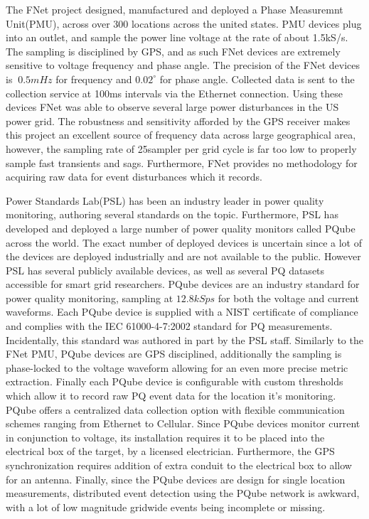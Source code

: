 The FNet project designed, manufactured and deployed a Phase Measuremnt Unit(PMU), across over 300 locations across the united states.\cite{zhang2010wide} PMU devices plug into an outlet, and sample the power line voltage at the rate of about 1.5kS/s. The sampling is disciplined by GPS, and as such FNet devices are extremely sensitive to voltage frequency and phase angle. The precision of the FNet devices is $~0.5mHz$ for frequency and $0.02^{\circ}$ for phase angle. Collected data is sent to the collection service at 100ms intervals via the Ethernet connection. Using these devices FNet was able to observe several large power disturbances in the US power grid. The robustness and sensitivity afforded by the GPS receiver makes this project an excellent source of frequency data across large geographical area, however,  the sampling rate of 25sampler per grid cycle is far too low to properly sample fast transients and sags. Furthermore, FNet provides no methodology for acquiring raw data for event disturbances which it records.

Power Standards Lab(PSL) has been an industry leader in power quality monitoring, authoring several standards on the topic. Furthermore, PSL has developed and deployed a large number of power quality monitors called PQube across the world. The exact number of deployed devices is uncertain since a lot of the devices are deployed industrially and are not available to the public. However PSL has several publicly available devices, as well as several PQ datasets accessible for smart grid researchers. PQube devices are an industry standard for power quality monitoring, sampling at $12.8kSps$ for both the voltage and current waveforms.\cite{pqube_spec} Each PQube device is supplied with a NIST certificate of compliance and complies with the IEC 61000-4-7:2002 standard for PQ measurements. Incidentally, this standard was authored in part by the PSL staff. Similarly to the FNet PMU, PQube devices are GPS disciplined, additionally the sampling is phase-locked to the voltage waveform allowing for an even more precise metric extraction. Finally each PQube device is configurable with custom thresholds which allow it to record raw PQ event data for the location it's monitoring. PQube offers a centralized data collection option with flexible communication schemes ranging from Ethernet to Cellular. Since PQube devices monitor current in conjunction to voltage, its installation requires it to be placed into the electrical box of the target, by a licensed electrician.\cite{von2014micro} Furthermore, the GPS synchronization requires addition of extra conduit to the electrical box to allow for an antenna. Finally, since the PQube devices are design for single location measurements, distributed event detection using the PQube network is awkward, with a lot of low magnitude gridwide events being incomplete or missing. 

